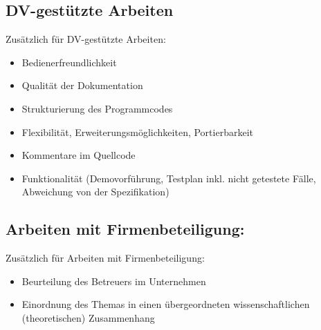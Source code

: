 \subsection{DV-gestützte Arbeiten}
Zusätzlich für DV-gestützte Arbeiten:
\begin{itemize}
	\item Bedienerfreundlichkeit 
	\item Qualität der Dokumentation 
	\item Strukturierung des Programmcodes 
	\item Flexibilität, Erweiterungsmöglichkeiten, Portierbarkeit 
	\item Kommentare im Quellcode 
	\item Funktionalität (Demovorführung, Testplan inkl. nicht getestete Fälle, Abweichung von der Spezifikation) 
\end{itemize}


\subsection{Arbeiten mit Firmenbeteiligung:}
Zusätzlich für Arbeiten mit Firmenbeteiligung:
\begin{itemize}
	\item Beurteilung des Betreuers im Unternehmen 
	\item Einordnung des Themas in einen übergeordneten wissenschaftlichen (theoretischen) Zusammenhang 
\end{itemize}

